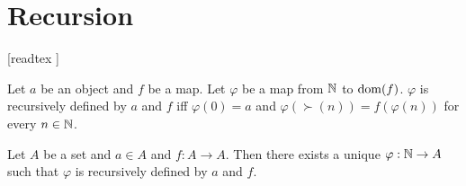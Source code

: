 \documentclass[../arithmetic.tex]{subfiles}
\begin{document}
  \chapter{Recursion}\label{chapter:recursion}


  \begin{forthel}

    [readtex ]

  \end{forthel}


  \begin{forthel}
    \begin{definition}
      Let $a$ be an object and $f$ be a map.
      Let $\varphi$ be a map from $\mathbb{N}$ to $\operatorname{dom}(f)$.
      $\varphi$ is recursively defined by $a$ and $f$ iff $\varphi(0) = a$ and
      $\varphi(\succ(n)) = f(\varphi(n))$ for every $n \in \mathbb{N}$.
    \end{definition}
  \end{forthel}

  \begin{theorem*}[Dedekind]
    Let $A$ be a set and $a \in A$ and $f : A \to A$.
    Then there exists a unique $\varphi : \mathbb{N} \to A$ such that $\varphi$ is
    recursively defined by $a$ and $f$.
  \end{theorem*}
\end{document}

